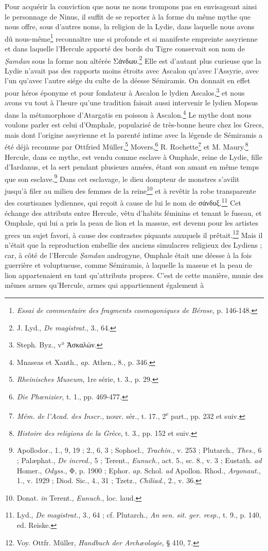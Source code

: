 \documentclass[a4paper, 11pt, oneside]{article}
\begin{document}
Pour acquérir la conviction que nous ne nous trompons pas en envisageant ainsi le personnage de Ninus, il suffit de se reporter à la forme du même mythe que nous offre, sous d'autres noms, la religion de la Lydie, dans laquelle nous avons dû nous-même\footnote{\emph{Essai de commentaire des fragments cosmogoniques de Bérose}, p. 146-148.} reconnaître une si profonde et si manifeste empreinte assyrienne et dans laquelle l'Hercule apporté des bords du Tigre conservait son nom de \emph{\d{S}amdan} sous la forme non altérée Σάνδωυ.\footnote{J. Lyd., \emph{De magistrat.}, 3., 64.} Elle est d'autant plus curieuse que la Lydie n'avait pas des rapports moins étroits avec Ascalon qu'avec l'Assyrie, avec l'un qu'avec l'autre siége du culte de la déesse Sémiramis. On donnait en effet pour héros éponyme et pour fondateur à Ascalon le lydien Ascalos,\footnote{Steph. Byz., v° Ἀσκαλών.} et nous avons vu tout à l'heure qu'une tradition faisait aussi intervenir le lydien Mopsus dans la métamorphose d'Atargatis en poisson à Ascalon.\footnote{Mnaseas et Xanth., \emph{ap.} Athen., 8., p. 346.} Le mythe dont nous voulons parler est celui d'Omphale, popularisé de très-bonne heure chez les Grecs, mais dont l'origine assyrienne et la parenté intime avec la légende de Sémiramis a été déjà reconnue par Ottfried Müller,\footnote{\emph{Rheinisches Museum}, 1re série, t. 3., p. 29.} Movers,\footnote{\emph{Die Phœnizier}, t. 1., pp. 469-477.} R. Rochette\footnote{\emph{Mém. de l'Acad. des Inscr.}, nouv. sér., t. 17., 2\textsuperscript{e} part., pp. 232 et suiv.} et M. Maury.\footnote{\emph{Histoire des religions de la Grèce}, t. 3., pp. 152 et suiv.} Hercule, dans ce mythe, est vendu comme esclave à Omphale, reine de Lydie, fille d'Iardanus, et la sert pendant plusieurs années, étant son amant en même temps que son esclave.\footnote{Apollodor., 1., 9, 19 ; 2., 6, 3 ; Sophocl., \emph{Trachin.}, v. 253 ; Plutarch., \emph{Thes.}, 6 ; Palæphat., \emph{De incred.}, 5 ; Terent., \emph{Eunuch.}, act. 5., sc. 8., v. 3 ; Eustath. \emph{ad} Homer., \emph{Odyss.}, Φ, p. 1900 ; Ephor. \emph{ap.} Schol. \emph{ad} Apollon. Rhod., \emph{Argonaut.}, 1., v. 1929 ; Diod. Sic., 4., 31 ; Tzetz., \emph{Chiliad.}, 2., v. 36.} Dans cet esclavage, le dieu dompteur de monstres s'avilit jusqu'à filer au milieu des femmes de la reine\footnote{Donat. \emph{in} Terent., \emph{Eunuch.}, loc. laud.} et à revêtir la robe transparente des courtisanes lydiennes, qui reçoit à cause de lui le nom de σάνδυξ.\footnote{Lyd., \emph{De magistrat.}, 3., 64 ; cf. Plutarch., \emph{An sen. sit. ger. resp.}, t. 9., p. 140, ed. Reiske.} Cet échange des attributs entre Hercule, vêtu d'habits féminins et tenant le fuseau, et Omphale, qui lui a pris la peau de lion et la massue, est devenu pour les artistes grecs un sujet favori, à cause des contrastes piquants auxquels il prêtait.\footnote{Voy. Ottfr. Müller, \emph{Handbuch der Archæologie}, § 410, 7.} Mais il n'était que la reproduction embellie des anciens simulacres religieux des Lydiens ; car, à côté de l'Hercule \emph{\d{S}amdan} androgyne, Omphale était une déesse à la fois guerrière et voluptueuse, comme Sémiramis, à laquelle la massue et la peau de lion appartenaient en tant qu'attributs propres. C'est de cette manière, munie des mêmes armes qu'Hercule, armes qui appartiennent également à 
\end{document}
